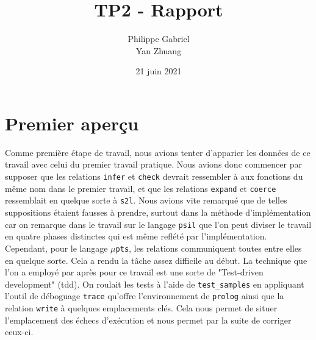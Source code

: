\documentclass[12pt, titlepage]{article}
\begin{document}
\title{{\Huge \textbf{TP2 - Rapport}}}
\author{Philippe Gabriel \\ Yan Zhuang}
\date{21 juin 2021}

\maketitle

\setcounter{page}{2}

\newpage

\section{Premier aperçu}
Comme première étape de travail, nous avions tenter d'apparier les données de
ce travail avec celui du premier travail pratique. Nous avions donc commencer
par supposer que les relations \texttt{infer} et \texttt{check} devrait
ressembler à aux fonctions du même nom dans le premier travail, et que les
relations \texttt{expand} et \texttt{coerce} ressemblait en quelque sorte à
\texttt{s2l}. Nous avions vite remarqué que de telles suppositions étaient
fausses à prendre, surtout dans la méthode d'implémentation car on remarque
dans le travail sur le langage \texttt{psil} que l'on peut diviser le travail
en quatre phases distinctes qui est même reflété par l'implémentation.
Cependant, pour le langage $\mu$\texttt{pts}, les relations communiquent toutes
entre elles en quelque sorte. Cela a rendu la tâche assez difficile au début.
La technique que l'on a employé par après pour ce travail est une sorte de
"Test-driven development" (tdd). On roulait les tests à l'aide de
\texttt{test\_samples} en appliquant l'outil de déboguage \texttt{trace}
qu'offre l'environnement de \texttt{prolog} ainsi que la relation
\texttt{write} à quelques emplacements clés. Cela nous permet de situer
l'emplacement des échecs d'exécution et nous permet par la suite de
corriger ceux-ci.
\end{document}
